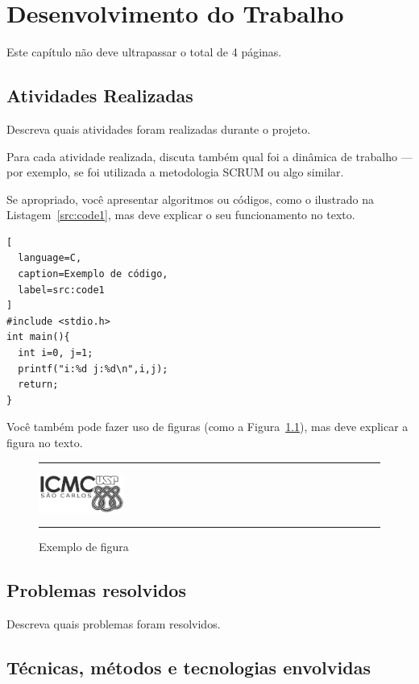 \chapter{Desenvolvimento do Trabalho}\label{chap:atividadesRealizadas}

Este capítulo não deve ultrapassar o total de 4 páginas.

\section{Atividades Realizadas}

Descreva quais atividades foram realizadas durante o projeto.

Para cada atividade realizada, discuta também qual foi a dinâmica de trabalho --- por exemplo, se foi utilizada a metodologia SCRUM ou algo similar.

Se apropriado, você apresentar algoritmos ou códigos, como o ilustrado na Listagem~\ref{src:code1}, mas deve explicar o seu funcionamento no texto.

\begin{lstlisting}[
  language=C,
  caption=Exemplo de código,
  label=src:code1
]
#include <stdio.h>
int main(){
  int i=0, j=1;
  printf("i:%d j:%d\n",i,j);
  return;
}
\end{lstlisting}

Você também pode fazer uso de figuras (como a Figura~\ref{fig:fig1}), mas deve explicar a figura no texto.

\begin{figure}[!ht]
  \rule[1ex]{\textwidth}{0.25pt}
  \centering\includegraphics[width=0.25\textwidth]{img/logoICMC.png}
  \caption[Exemplo de figura]
  {Exemplo de figura}\label{fig:fig1}
  \rule[1ex]{\textwidth}{0.25pt}
\end{figure}


\section{Problemas resolvidos}

Descreva quais problemas foram resolvidos.


\section{Técnicas, métodos e tecnologias envolvidas}

